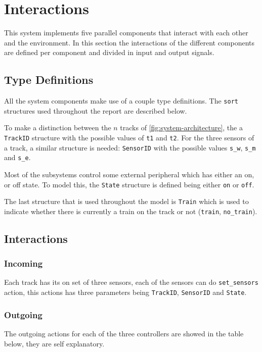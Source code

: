 \documentclass[final]{report}
\begin{document}
\chapter{Interactions}\label{ch:interactions}
This system implements five parallel components that interact with each other and the environment.
In this section the interactions of the different components are defined per component and divided in input and output signals.

\section{Type Definitions}\label{sec:interactions-typedef}
All the system components make use of a couple type definitions.
The \texttt{sort} structures used throughout the report are described below.

To make a distinction between the $n$ tracks of \cref{fig:system-architecture}, the a \texttt{TrackID} structure with the possible values of \texttt{t1} and \texttt{t2}.
For the three sensors of a track, a similar structure is needed: \texttt{SensorID} with the possible values \texttt{s\_w}, \texttt{s\_m} and \texttt{s\_e}.

Most of the subsystems control some external peripheral which has either an on, or off state.
To model this, the \texttt{State} structure is defined being either \texttt{on} or \texttt{off}.

The last structure that is used throughout the model is \texttt{Train} which is used to indicate whether there is currently a train on the track or not (\texttt{train}, \texttt{no\_train}).

\section{Interactions}\label{sec:interactions-external}
\subsection{Incoming}
Each track has its on set of three sensors, each of the sensors can do \texttt{set\_sensors} action, this actions has three parameters being \texttt{TrackID}, \texttt{SensorID} and \texttt{State}.

\subsection{Outgoing}
The outgoing actions for each of the three controllers are showed in the table below, they are self explanatory.
\end{document}
